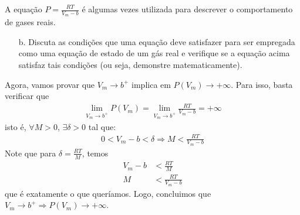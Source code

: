 \begin{xcs}
    A equação \( P = \frac{RT}{V_m - b} \) é algumas vezes utilizada para
    descrever o comportamento de gases reais. 
    \begin{enumerate}[label=\alph*.]
        \item[b.] Discuta as condições que uma equação deve satisfazer para ser
            empregada como uma equação de estado de um gás real e verifique se a
            equação acima satisfaz tais condições (ou seja, demonstre
            matematicamente). 
    \end{enumerate}
\end{xcs}
\begin{rsl}
    Agora, vamos provar que \( V_m \to b^+ \) implica em \( P(V_m) \to +\infty \).
    Para isso, basta verificar que 
    \begin{align*}
        \lim_{V_m \to b^+} P(V_m) = \lim_{V_m \to b^+} \frac{RT}{V_m-b} = +\infty
    \end{align*}
    isto é, \( \forall M > 0 \), \( \exists \delta > 0 \) tal que:
    \begin{align*}
        0 < V_m - b < \delta \Rightarrow M < \frac{RT}{V_m-b}
    \end{align*}
    Note que para \( \delta = \frac{RT}{M} \), temos
    \begin{align*}
        V_m - b &< \frac{RT}{M}\\
        M &< \frac{RT}{V_m - b} 
    \end{align*}
    que é exatamente o que queríamos. Logo, concluimos que \( V_m \to b^+
    \Rightarrow P(V_m) \to +\infty \).
\end{rsl}
